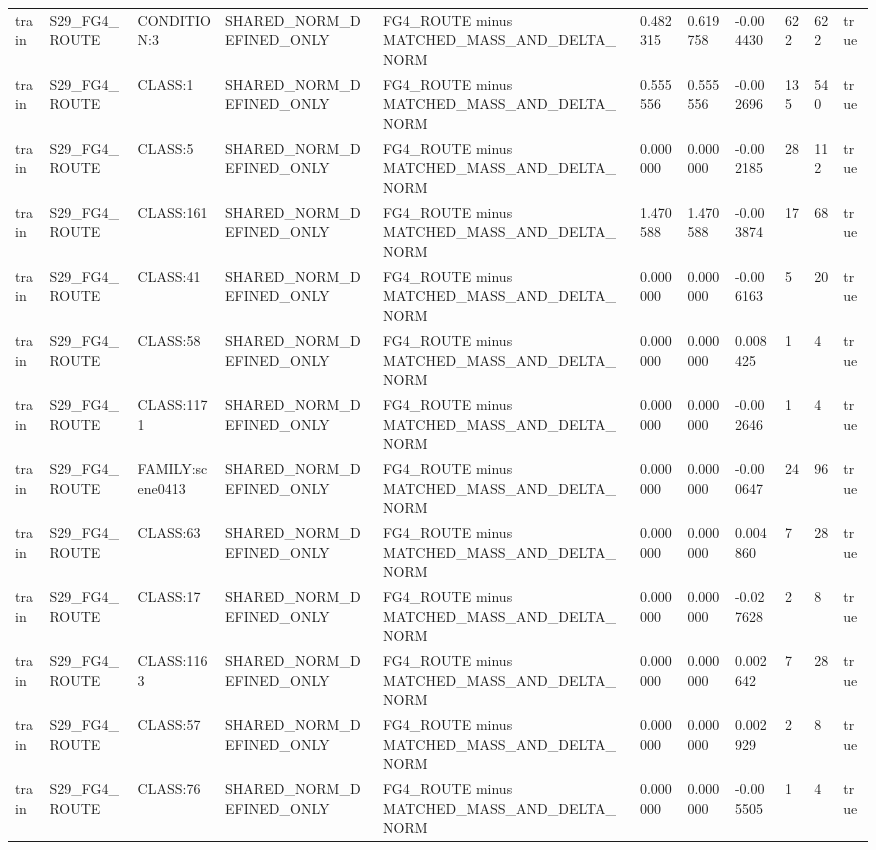 \begin{tabular}{lllllllllll}
train & S29\_FG4\_ROUTE & CONDITION:3 & SHARED\_NORM\_DEFINED\_ONLY & FG4\_ROUTE minus MATCHED\_MASS\_AND\_DELTA\_NORM & 0.482315 & 0.619758 & -0.004430 & 622 & 622 & true \\
train & S29\_FG4\_ROUTE & CLASS:1 & SHARED\_NORM\_DEFINED\_ONLY & FG4\_ROUTE minus MATCHED\_MASS\_AND\_DELTA\_NORM & 0.555556 & 0.555556 & -0.002696 & 135 & 540 & true \\
train & S29\_FG4\_ROUTE & CLASS:5 & SHARED\_NORM\_DEFINED\_ONLY & FG4\_ROUTE minus MATCHED\_MASS\_AND\_DELTA\_NORM & 0.000000 & 0.000000 & -0.002185 & 28 & 112 & true \\
train & S29\_FG4\_ROUTE & CLASS:161 & SHARED\_NORM\_DEFINED\_ONLY & FG4\_ROUTE minus MATCHED\_MASS\_AND\_DELTA\_NORM & 1.470588 & 1.470588 & -0.003874 & 17 & 68 & true \\
train & S29\_FG4\_ROUTE & CLASS:41 & SHARED\_NORM\_DEFINED\_ONLY & FG4\_ROUTE minus MATCHED\_MASS\_AND\_DELTA\_NORM & 0.000000 & 0.000000 & -0.006163 & 5 & 20 & true \\
train & S29\_FG4\_ROUTE & CLASS:58 & SHARED\_NORM\_DEFINED\_ONLY & FG4\_ROUTE minus MATCHED\_MASS\_AND\_DELTA\_NORM & 0.000000 & 0.000000 & 0.008425 & 1 & 4 & true \\
train & S29\_FG4\_ROUTE & CLASS:1171 & SHARED\_NORM\_DEFINED\_ONLY & FG4\_ROUTE minus MATCHED\_MASS\_AND\_DELTA\_NORM & 0.000000 & 0.000000 & -0.002646 & 1 & 4 & true \\
train & S29\_FG4\_ROUTE & FAMILY:scene0413 & SHARED\_NORM\_DEFINED\_ONLY & FG4\_ROUTE minus MATCHED\_MASS\_AND\_DELTA\_NORM & 0.000000 & 0.000000 & -0.000647 & 24 & 96 & true \\
train & S29\_FG4\_ROUTE & CLASS:63 & SHARED\_NORM\_DEFINED\_ONLY & FG4\_ROUTE minus MATCHED\_MASS\_AND\_DELTA\_NORM & 0.000000 & 0.000000 & 0.004860 & 7 & 28 & true \\
train & S29\_FG4\_ROUTE & CLASS:17 & SHARED\_NORM\_DEFINED\_ONLY & FG4\_ROUTE minus MATCHED\_MASS\_AND\_DELTA\_NORM & 0.000000 & 0.000000 & -0.027628 & 2 & 8 & true \\
train & S29\_FG4\_ROUTE & CLASS:1163 & SHARED\_NORM\_DEFINED\_ONLY & FG4\_ROUTE minus MATCHED\_MASS\_AND\_DELTA\_NORM & 0.000000 & 0.000000 & 0.002642 & 7 & 28 & true \\
train & S29\_FG4\_ROUTE & CLASS:57 & SHARED\_NORM\_DEFINED\_ONLY & FG4\_ROUTE minus MATCHED\_MASS\_AND\_DELTA\_NORM & 0.000000 & 0.000000 & 0.002929 & 2 & 8 & true \\
train & S29\_FG4\_ROUTE & CLASS:76 & SHARED\_NORM\_DEFINED\_ONLY & FG4\_ROUTE minus MATCHED\_MASS\_AND\_DELTA\_NORM & 0.000000 & 0.000000 & -0.005505 & 1 & 4 & true \\

\end{tabular}
